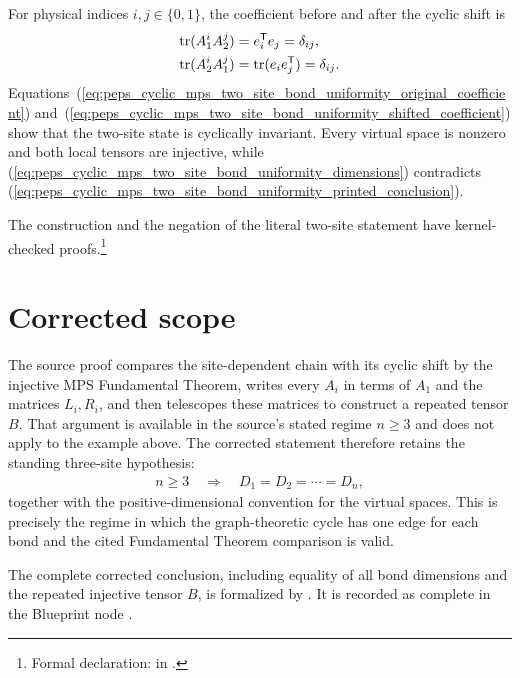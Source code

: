 \documentclass{article}
\begin{document}
For physical indices $i,j\in\{0,1\}$, the coefficient before and after the
cyclic shift is
\begin{align}
    \operatorname{tr}(A_1^iA_2^j)
        &=e_i^{\mathsf T}e_j
         =\delta_{ij},
    \label{eq:peps_cyclic_mps_two_site_bond_uniformity_original_coefficient}\\
    \operatorname{tr}(A_2^iA_1^j)
        &=\operatorname{tr}(e_i e_j^{\mathsf T})
         =\delta_{ij}.
    \label{eq:peps_cyclic_mps_two_site_bond_uniformity_shifted_coefficient}
\end{align}
Equations~(\ref{eq:peps_cyclic_mps_two_site_bond_uniformity_original_coefficient})
and~(\ref{eq:peps_cyclic_mps_two_site_bond_uniformity_shifted_coefficient})
show that the two-site state is cyclically invariant.  Every virtual space is
nonzero and both local tensors are injective, while
(\ref{eq:peps_cyclic_mps_two_site_bond_uniformity_dimensions}) contradicts
(\ref{eq:peps_cyclic_mps_two_site_bond_uniformity_printed_conclusion}).

The construction and the negation of the literal two-site statement have
kernel-checked proofs.\footnote{Formal declaration:
in .}

\section{Corrected scope}

The source proof compares the site-dependent chain with its cyclic shift by
the injective MPS Fundamental Theorem, writes every $A_i$ in terms of $A_1$
and the matrices $L_i,R_i$, and then telescopes these matrices to construct a
repeated tensor $B$.  That argument is available in the source's stated regime
$n\geq3$ and does not apply to the example above.  The corrected statement
therefore retains the standing three-site hypothesis:
\begin{align}
    n\geq3
    \quad\Longrightarrow\quad
    D_1=D_2=\cdots=D_n,
    \label{eq:peps_cyclic_mps_two_site_bond_uniformity_corrected_scope}
\end{align}
together with the positive-dimensional convention for the virtual spaces.
This is precisely the regime in which the graph-theoretic cycle has one edge
for each bond and the cited Fundamental Theorem comparison is valid.

The complete corrected conclusion, including equality of all bond dimensions
and the repeated injective tensor $B$, is formalized by
.
It is recorded as complete in the Blueprint node
.
\end{document}
